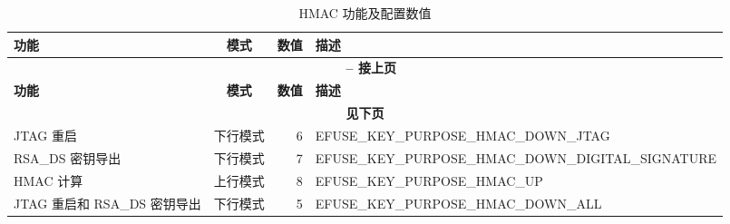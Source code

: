 \begin{longtable}[c]{|p{2cm}|c|r|p{9.5cm}|}
\caption{HMAC 功能及配置数值}
\label{tab:hmac-key-purpose}
\\    \hline
    \rowcolor{lightgray}
    \textbf{功能} & \textbf{模式} & \textbf{数值} & \textbf{描述} \\\hline
    \endfirsthead

    \multicolumn{4}{c}{\bfseries \tablename\ \thetable{} -- 接上页}\\\hline

    \rowcolor{lightgray}
    \textbf{功能} & \textbf{模式} & \textbf{数值} & \textbf{描述} \\\hline
    \endhead
    \multicolumn{4}{c}{\textbf{见下页}}\\
    \endfoot
    \endlastfoot
    \hline

    JTAG 重启 & 下行模式 & 6 & EFUSE\_KEY\_PURPOSE\_HMAC\_DOWN\_JTAG \\
    \hline
    RSA\_DS 密钥导出 & 下行模式 & 7 & EFUSE\_KEY\_PURPOSE\_HMAC\_DOWN\_DIGITAL\_SIGNATURE \\
    \hline
    HMAC 计算 & 上行模式 & 8 & EFUSE\_KEY\_PURPOSE\_HMAC\_UP \\
    \hline
    JTAG 重启和 RSA\_DS 密钥导出 & 下行模式 & 5 & EFUSE\_KEY\_PURPOSE\_HMAC\_DOWN\_ALL \\
    \hline
\end{longtable}
